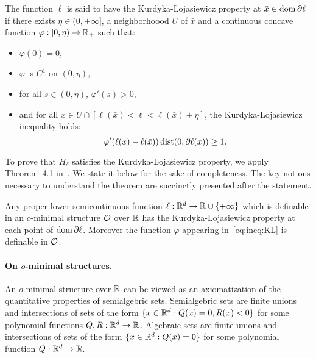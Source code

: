 \begin{definition}
  The  function $\ell$  is said  to have  the Kurdyka-Lojasiewicz  property at
  $\bar{x} \in \operatorname{dom} \partial \ell$ if  there exists $\eta \in (0, +\infty]$, a
  neighborhoood   $U$  of   $\bar{x}$  and   a  continuous   concave  function
  $\varphi : [0, \eta) \to \mathbb{R}_{+}$ such that:
  \begin{itemize}
  \item $\varphi(0) = 0$,
  \item $\varphi$ is $C^{1}$ on $(0,\eta)$,
  \item for all $s \in (0,\eta)$, $\varphi'(s) > 0$,
  \item                     and                    for                     all
    $x  \in  U \cap  [\ell(\bar{x})  <  \ell  <  \ell(\bar{x}) +  \eta]$,  the
    Kurdyka-Lojasiewicz inequality holds:
    \begin{equation}
      \label{eq:ineq:KL}
      \varphi'(\ell(x) - \ell(\bar{x}))  \operatorname{dist}(0, \partial \ell(x)) \geq
      1. 
    \end{equation}
  \end{itemize}
\end{definition}



To  prove that  $H_{\delta}$  satisfies the  Kurdyka-Lojasiewicz property,  we
apply Theorem~4.1  in~\cite{attouch2013proximal}.  We  state it below  for the
sake of completeness. The key notions  necessary to understand the theorem are
succinctly presented after the statement. 
\begin{theorem}
  \label{thm:attouch}
  Any          proper          lower          semicontinuous          function
  $\ell:\mathbb{R}^{d}  \to  \mathbb{R}  \cup  \{+\infty\}$   which  is  definable  in  an
  $o$-minimal  structure  $\mathcal{O}$  over  $\mathbb{R}$  has  the  Kurdyka-Lojasiewicz
  property  at each  point of  $\operatorname{dom}  \partial \ell$.   Moreover the  function
  $\varphi$ appearing in~\eqref{eq:ineq:KL} is definable in $\mathcal{O}$.
\end{theorem}

\paragraph{On $o$-minimal structures.}

An $o$-minimal structure over $\mathbb{R}$ can be viewed as an axiomatization of the
quantitative properties  of semialgebric  sets.  Semialgebric sets  are finite
unions      and      intersections      of     sets      of      the      form
$\{x  \in \mathbb{R}^{d}  : Q(x)  = 0,  R(x) <  0\}$ for  some polynomial  functions
$Q,R:\mathbb{R}^{d} \to \mathbb{R}$.   Algebraic sets are finite  unions and intersections
of  sets of  the form  $\{x \in  \mathbb{R}^{d} :  Q(x) =  0\}$ for  some polynomial
function $Q:\mathbb{R}^{d} \to \mathbb{R}$.

